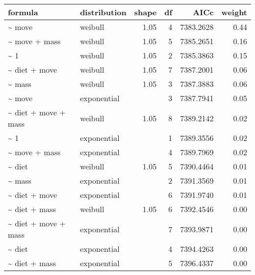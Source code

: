\begin{table}[ht]
\centering
\begin{tabular}{llrrrr}
 formula & distribution & shape & df & AICc & weight \\ 
  \hline
\~{} move & weibull & 1.05 & 4 & 7383.2628 & 0.44 \\ 
  \~{} move + mass & weibull & 1.05 & 5 & 7385.2651 & 0.16 \\ 
  \~{} 1 & weibull & 1.05 & 2 & 7385.3863 & 0.15 \\ 
  \~{} diet + move & weibull & 1.05 & 7 & 7387.2001 & 0.06 \\ 
  \~{} mass & weibull & 1.05 & 3 & 7387.3883 & 0.06 \\ 
  \~{} move & exponential &  & 3 & 7387.7941 & 0.05 \\ 
  \~{} diet + move + mass & weibull & 1.05 & 8 & 7389.2142 & 0.02 \\ 
  \~{} 1 & exponential &  & 1 & 7389.3556 & 0.02 \\ 
  \~{} move + mass & exponential &  & 4 & 7389.7969 & 0.02 \\ 
  \~{} diet & weibull & 1.05 & 5 & 7390.4464 & 0.01 \\ 
  \~{} mass & exponential &  & 2 & 7391.3569 & 0.01 \\ 
  \~{} diet + move & exponential &  & 6 & 7391.9740 & 0.01 \\ 
  \~{} diet + mass & weibull & 1.05 & 6 & 7392.4546 & 0.00 \\ 
  \~{} diet + move + mass & exponential &  & 7 & 7393.9871 & 0.00 \\ 
  \~{} diet & exponential &  & 4 & 7394.4263 & 0.00 \\ 
  \~{} diet + mass & exponential &  & 5 & 7396.4337 & 0.00 \\ 
  \end{tabular}
\label{tab:na}
\end{table}
